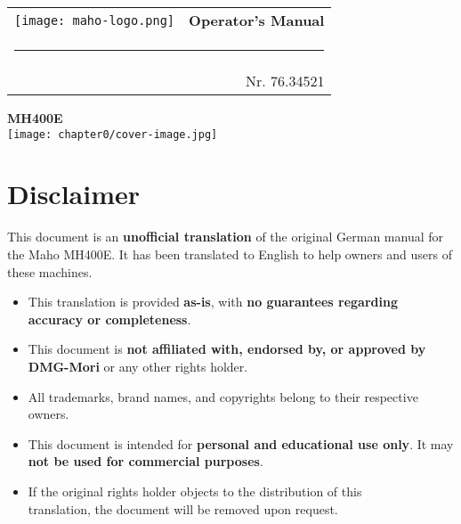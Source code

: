 
\thispagestyle{coverpage}

\begin{titlepage}
    \thispagestyle{coverpage}

    \vspace*{0cm}

    {\sffamily

        \noindent
        \begin{tabularx}{\textwidth}{X r}
            \texttt{[image: maho-logo.png]} &
            {\Huge \textbf{Operator's Manual}} \\
            \multicolumn{2}{l}{\rule{\textwidth}{0.4mm}} \\
            & {\normalsize Nr. 76.34521}
        \end{tabularx}

        \centering
        \vspace{2cm}

        {\fontsize{60pt}{62pt} \bfseries MH400E}\\[1cm]

        \texttt{[image: chapter0/cover-image.jpg]} 

        \vfill

         \noindent
         \begin{center}
             \parbox{\textwidth}{}
         \end{center}
    }
\end{titlepage}

\newpage

\section*{Disclaimer}

This document is an \textbf{unofficial translation} of the original German manual for the Maho MH400E. It has been translated to English to help owners and users of these machines.

\begin{itemize}
    \item This translation is provided \textbf{as-is}, with \textbf{no guarantees regarding accuracy or completeness}.
    \item This document is \textbf{not affiliated with, endorsed by, or approved by DMG-Mori} or any other rights holder.
    \item All trademarks, brand names, and copyrights belong to their respective \\owners.
    \item This document is intended for \textbf{personal and educational use only}. It may \textbf{not be used for commercial purposes}.
    \item If the original rights holder objects to the distribution of this \\translation, the document will be removed upon request.
\end{itemize}

